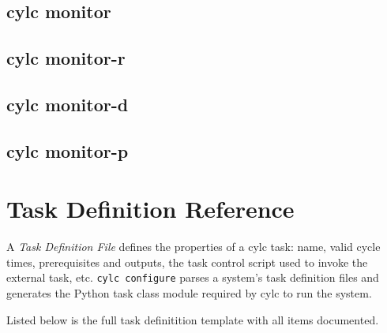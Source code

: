 \documentclass[11pt,a4paper]{article}
\begin{document}
{

}

\pagebreak
\subsection{cylc monitor}
{

}

\subsection{cylc monitor-r}
{

}

\subsection{cylc monitor-d}
{

}

\subsection{cylc monitor-p}
{

}

\pagebreak
\section{Task Definition Reference}

A {\em Task Definition File} defines the properties of a cylc task:
name, valid cycle times, prerequisites and outputs, the task
control script used to invoke the external task, etc.  
\lstinline=cylc configure= parses a system's task definition files and
generates the Python task class module required by cylc to run the
system.

Listed below is the full task definitition template with all items documented.

\lstset{language=cylctaskdef}

{

}

\lstset{language=}


\end{document}

